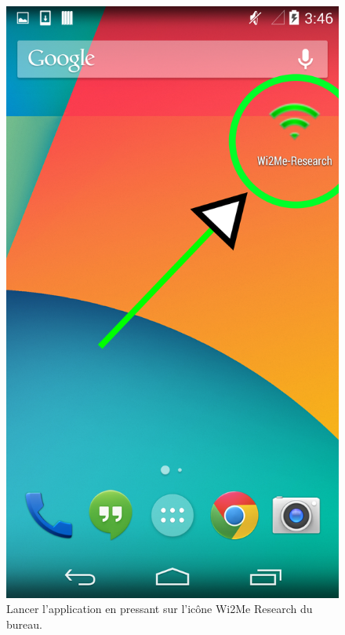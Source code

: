 \documentclass[11pt]{article}
\newcommand\mtext[2]{#1}
\newcommand\mtext[2]{#2}
\begin{document}
\begin{figure}
  \centering
  \caption{ \mtext{Lancer l'application en pressant sur l'icône Wi2Me Research du bureau.}{Start the application by pressing the Wi2Me Research application on the desktop.}}
  \includegraphics[height=0.4\textheight]{open.png}
\end{figure}
\end{document}
